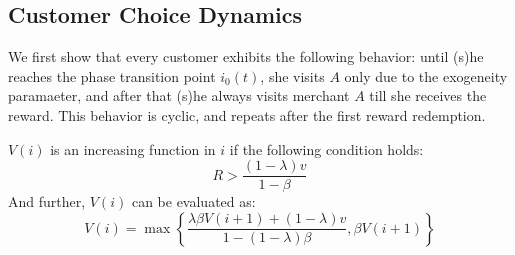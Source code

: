 \subsection{Customer Choice Dynamics}
We first show that every customer exhibits the following behavior: until (s)he reaches the phase transition point $i_0(t)$, she visits $A$ only due to the exogeneity paramaeter, and after that (s)he always visits merchant $A$ till she receives the reward.
This behavior is cyclic, and repeats after the first reward redemption.

\begin{lemma} $V(i)$ is an increasing function in $i$ if the following condition holds:
\begin{equation}
R > \frac{(1-\lambda)v}{1-\beta}
\end{equation}
And further, $V(i)$ can be evaluated as:
\begin{equation}
V(i) = \max\left\{ \frac{\lambda \beta V(i+1)+(1-\lambda)v}{1-(1-\lambda)\beta}, \beta V(i+1) \right\}
\end{equation}
\end{lemma}

